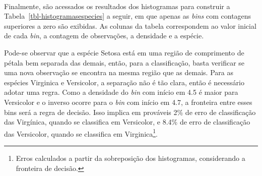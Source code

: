 \documentclass[
  a4paperpaper,
]{article}
\newenvironment{Shaded}{\begin{snugshade}}{\end{snugshade}}
\newcommand{\AttributeTok}[1]{\textcolor[rgb]{0.40,0.45,0.13}{#1}}
\newcommand{\CommentTok}[1]{\textcolor[rgb]{0.37,0.37,0.37}{#1}}
\newcommand{\FunctionTok}[1]{\textcolor[rgb]{0.28,0.35,0.67}{#1}}
\newcommand{\NormalTok}[1]{\textcolor[rgb]{0.00,0.23,0.31}{#1}}
\newcommand{\OtherTok}[1]{\textcolor[rgb]{0.00,0.23,0.31}{#1}}
\newcommand{\SpecialCharTok}[1]{\textcolor[rgb]{0.37,0.37,0.37}{#1}}
\newcommand{\StringTok}[1]{\textcolor[rgb]{0.13,0.47,0.30}{#1}}
\begin{document}
\begin{Shaded}
\end{Shaded}

\begin{Shaded}
\end{Shaded}

~

Finalmente, são acessados os resultados dos histogramas para construir a
Tabela~\ref{tbl-histogramasespecies} a seguir, em que apenas as
\emph{bins} com contagens superiores a zero são exibidas. As colunas da
tabela correspondem ao valor inicial de cada \emph{bin}, a contagem de
observações, a densidade e a espécie.

Pode-se observar que a espécie Setosa está em uma região de comprimento
de pétala bem separada das demais, então, para a classificação, basta
verificar se uma nova observação se encontra na mesma região que as
demais. Para as espécies Virginica e Versicolor, a separação não é tão
clara, então é necessário adotar uma regra. Como a densidade do
\emph{bin} com início em 4.5 é maior para Versicolor e o inverso ocorre
para o \emph{bin} com início em 4.7, a fronteira entre esses bins será a
regra de decisão. Isso implica em prováveis 2\% de erro de classificação
das Virgínica, quando se classifica em Versicolor, e 8.4\% de erro de
classificação das Versicolor, quando se classifica em
Virginica\footnote{Erros calculados a partir da sobreposição dos
  histogramas, considerando a fronteira de decisão.}.
\end{document}
